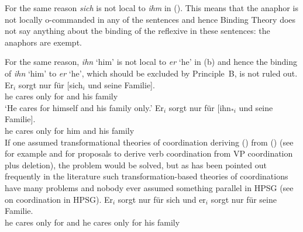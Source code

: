 \documentclass[output=paper
 	        ,biblatex
                ,babelshorthands
                ,newtxmath
                ,draftmode
                ,colorlinks, citecolor=brown
]{langscibook}
\begin{document}
For the same reason \emph{sich} is not local to \emph{ihm} in (). This means that the anaphor is not locally o-commanded in any
of the sentences and hence Binding Theory does not say anything about the binding of the reflexive
in these sentences: the anaphors are exempt. 

For the same reason, \emph{ihn} `him' is not local to \emph{er} `he' in (b) and hence the
binding of \emph{ihn} `him' to \emph{er} `he', which should be excluded by Principle~B, is not ruled out.
\eal
\label{ex-sorgt-fuer-sich-und-seine-familie}
\ex
\gll Er$_{i}$ sorgt nur für [sich$_{i}$ und seine Familie].\\
     he      cares only for \spacebr{}\self{} and his family\\
\glt `He cares for himself and his family only.'
\ex 
\gll Er$_{i}$ sorgt nur für [ihn$_{*i}$ und seine Familie].\\
     he      cares only for \spacebr{}him and his family\\
\zl
If one assumed transformational theories of coordination deriving () from () (see for example
\citealp[]{WC80a-u} and \citealp[, 67]{Kayne94a-u} for proposals to derive verb
coordination from VP coordination plus deletion), the problem would be solved, but as has been
pointed out frequently in the literature such transformation-based theories of coordinations have
many problems \parencites[]{BV72}[--193]{Jackendoff77a}[]{Dowty79a}[--105]{denBesten83a}{Klein85}{Eisenberg94a}[]{Borsley2005a} and nobody ever assumed
something parallel in HPSG (see  on coordination in HPSG).
\ea
\gll Er$_{i}$ sorgt nur für sich     und er$_{i}$ sorgt nur für seine Familie.\\
     he      cares only for \self{} and he       cares only for his family\\
\z
\end{document}
